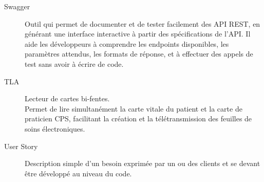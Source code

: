 \documentclass{article}
\begin{document}
\begin{description}
    \item[Swagger\label{term:swagger}] Outil qui permet de documenter et de tester facilement des API REST, en générant une interface interactive à partir des spécifications de l'API. Il aide les développeurs à comprendre les endpoints disponibles, les paramètres attendus, les formats de réponse, et à effectuer des appels de test sans avoir à écrire de code. 

    \item[TLA\label{term:tla}] Lecteur de cartes bi-fentes. \\ Permet de lire simultanément la carte vitale du patient et la carte de praticien CPS, facilitant la création et la télétransmission des feuilles de soins électroniques.
    
    \item[User Story\label{term:us}] Description simple d'un besoin exprimée par un ou des clients et se devant être développé au niveau du code.

\end{description}




\end{document}

